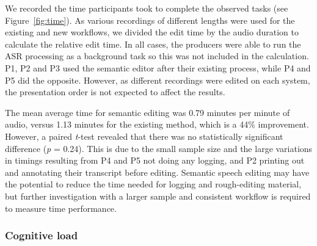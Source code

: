 We recorded the time participants took to complete the observed tasks (see Figure~\ref{fig:time}). As various
recordings of different lengths were used for the existing and new workflows, we divided the edit time by the audio
duration to calculate the relative edit time.  In all cases, the producers were able to run the ASR processing as a
background task so this was not included in the calculation. P1, P2 and P3 used the semantic editor after their
existing process, while P4 and P5 did the opposite. However, as different recordings were edited on each system, the
presentation order is not expected to affect the results.

The mean average time for semantic editing was 0.79 minutes per minute of audio, versus 1.13 minutes for the existing
method, which is a 44\% improvement. However, a paired \textit{t}-test revealed that there was no statistically
significant difference (\textit{p} = 0.24).  This is due to the small sample size and the large variations in timings
resulting from P4 and P5 not doing any logging, and P2 printing out and annotating their transcript before editing.
Semantic speech editing may have the potential to reduce the time needed for logging and rough-editing material, but
further investigation with a larger sample and consistent workflow is required to measure time performance.




\subsubsection{Cognitive load}


